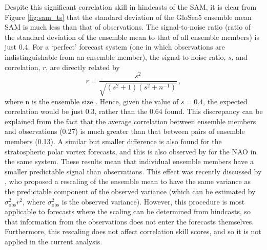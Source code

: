 Despite this significant correlation skill in hindcasts of the SAM, it is clear
from Figure \ref{fig:sam_ts} that the standard deviation of the GloSea5 ensemble
mean SAM is much less than that of observations. The signal-to-noise ratio
(ratio of the standard deviation of the ensemble mean to that of all ensemble
members) is just 0.4. For a `perfect' forecast system (one in which observations
are indistinguishable from an ensemble member), the signal-to-noise ratio, $s$,
and correlation, $r$, are directly related by 
\begin{equation}
r = \frac{s^2}{\sqrt{(s^2+1)(s^2+n^{-1})}} \, , 
\end{equation}
where n is the ensemble size \citep{Sardeshmukh2000,Kumar2009}. Hence, given the
value of $s=0.4$, the expected correlation would be just 0.3, rather than the
0.64 found. This discrepancy can be explained from the fact that the average
correlation between ensemble members and observations (0.27) is much greater
than that between pairs of ensemble members (0.13). A similar but smaller
difference is also found for the stratospheric polar vortex forecasts, and this
is also observed by \citet{Scaife2013} for the NAO in the same system. These
results mean that individual ensemble members have a smaller predictable signal
than observations. This effect was recently discussed by \citet{Eade2014}, who
proposed a rescaling of the ensemble mean to have the same variance as the
predictable component of the observed variance (which can be estimated by
$\sigma^2_{\mathrm{obs}}r^2$, where $\sigma^2_{\mathrm{obs}}$ is the observed
variance). However, this procedure is most applicable to forecasts where the
scaling can be determined from hindcasts, so that information from the
observations does not enter the forecasts themselves. Furthermore, this
rescaling does not affect correlation skill scores, and so it is not applied in
the current analysis.

